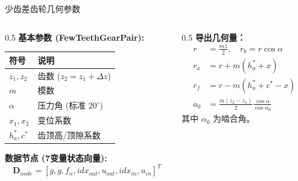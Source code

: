 \documentclass[aspectratio=169,10pt,xcolor=table]{ctexbeamer}
\begin{document}
\begin{frame}{少齿差齿轮几何参数}
  \begin{columns}[T]
    \begin{column}{0.5\textwidth}
      \textbf{基本参数 (FewTeethGearPair):}
      \begin{table}
      \small
      \begin{tabular}{ll}
      \toprule
      符号 & 说明 \\
      \midrule
      $z_1, z_2$ & 齿数 ($z_2 = z_1 + \Delta z$) \\
      $m$ & 模数 \\
      $\alpha$ & 压力角 (标准 $20^\circ$) \\
      $x_1, x_2$ & 变位系数 \\
      $h_a^*, c^*$ & 齿顶高/顶隙系数 \\
      \bottomrule
      \end{tabular}
      \end{table}
      
      \textbf{数据节点 (7变量状态向量):}
      \begin{equation*}
        \mathbf{D}_{node} = [g, \dot{g}, f_n, idx_{out}, u_{out}, idx_{in}, u_{in}]^T
      \end{equation*}
    \end{column}
    \begin{column}{0.5\textwidth}
      \textbf{导出几何量：}
      \small
      \begin{align}
      r &= \frac{m z}{2}, \quad r_b = r \cos\alpha \\
      r_a &= r + m(h_a^* + x) \\
      r_f &= r - m(h_a^* + c^* - x) \\
      a_0 &= \frac{m(z_2 - z_1)}{2} \frac{\cos\alpha}{\cos\alpha_0}
      \end{align}
      其中 $\alpha_0$ 为啮合角。
    \end{column}
  \end{columns}
\end{frame}
\end{document}
